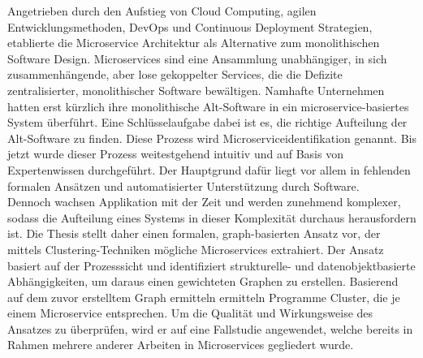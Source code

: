 
\Abstract
Angetrieben durch den Aufstieg von Cloud Computing, agilen Entwicklungsmethoden, DevOps und Continuous Deployment Strategien, etablierte die Microservice Architektur als Alternative zum monolithischen Software Design. Microservices sind eine Ansammlung unabhängiger, in sich zusammenhängende, aber lose gekoppelter Services, die die Defizite zentralisierter, monolithischer Software bewältigen. Namhafte Unternehmen hatten erst kürzlich ihre monolithische Alt-Software in ein microservice-basiertes System überführt. Eine Schlüsselaufgabe dabei ist es, die richtige Aufteilung der Alt-Software zu finden. Diese Prozess wird Microserviceidentifikation genannt. Bis jetzt wurde dieser Prozess weitestgehend intuitiv und auf Basis von Expertenwissen durchgeführt. Der Hauptgrund dafür liegt vor allem in fehlenden formalen Ansätzen und automatisierter Unterstützung durch Software.\\
Dennoch wachsen Applikation mit der Zeit und werden zunehmend komplexer, sodass die Aufteilung eines Systems in dieser Komplexität durchaus herausfordern ist. Die Thesis stellt daher einen formalen, graph-basierten Ansatz vor, der mittels Clustering-Techniken mögliche Microservices extrahiert. Der Ansatz basiert auf der Prozesssicht und identifiziert strukturelle- und datenobjektbasierte Abhängigkeiten, um daraus einen gewichteten Graphen zu erstellen. Basierend auf dem zuvor erstelltem Graph ermitteln ermitteln Programme Cluster, die je einem Microservice entsprechen. Um die Qualität und Wirkungsweise des Ansatzes zu überprüfen, wird er auf eine Fallstudie angewendet, welche bereits in Rahmen mehrere anderer Arbeiten in Microservices gegliedert wurde. 
